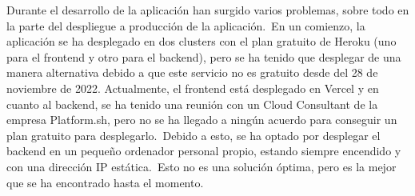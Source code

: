 
Durante el desarrollo de la aplicación han surgido varios problemas, sobre todo en la parte del despliegue a producción
de la aplicación.\ En un comienzo, la aplicación se ha desplegado en dos clusters con el plan gratuito de Heroku (uno
para el frontend y otro para el backend), pero se ha tenido que desplegar de una manera alternativa debido a que este
servicio no es gratuito desde del 28 de noviembre de 2022.
Actualmente, el frontend está desplegado en Vercel y en cuanto al backend, se ha tenido una reunión con un Cloud
Consultant de la empresa Platform.sh, pero no se ha llegado a ningún acuerdo para conseguir un plan gratuito para
desplegarlo.\ Debido a esto, se ha optado por desplegar el backend en un pequeño ordenador personal propio, estando
siempre encendido y con una dirección IP estática.\ Esto no es una solución óptima, pero es la mejor que se ha
encontrado hasta el momento.
